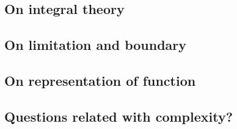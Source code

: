 
\subsection{On integral theory}\label{sec:integral}

\subsection{On limitation and boundary}\label{sec:boundary}

\subsection{On representation of function}\label{sec:function}

\subsection{Questions related with complexity?}\label{sec:complexity}
